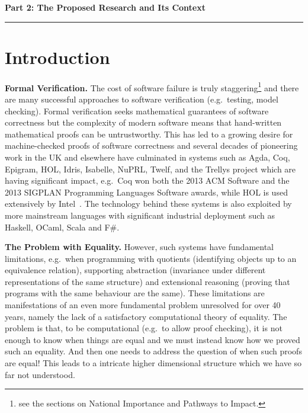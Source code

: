 \documentclass[a4paper,11pt]{article}
\newcommand{\eg}{{e.g.}\ }
\begin{document}
\newpage
\noindent
{\bf \Large Part 2: The Proposed Research and Its Context}

\vspace*{-0.23in}

\begin{center}
\rule{170mm}{.5mm}
\end{center}

\vspace*{-0.4in}

\section{Introduction}\label{sec:intro}

\vspace*{-0.1in}

{\bf Formal Verification.} The cost of software failure is truly
staggering\footnote{see the sections on National Importance and
  Pathways to Impact.} and there are many successful approaches to
software verification (\eg testing, model checking). Formal
verification seeks mathematical guarantees of software correctness but
the complexity of modern software means that hand-written mathematical
proofs can be untrustworthy. This has led to a growing desire for
machine-checked proofs of software correctness and several decades of
pioneering work in the UK and elsewhere have culminated in systems
such as Agda, Coq, Epigram, HOL, Idris, Isabelle, NuPRL, Twelf, and
the Trellys project which are having significant impact, \eg Coq won
both the 2013 ACM Software and the 2013 SIGPLAN Programming Languages
Software awards, while HOL is used extensively by
Intel~\cite{harrison:sfm}. The technology behind these systems is also
exploited by more mainstream languages with significant industrial
deployment such as Haskell, OCaml, Scala and F\#.


{\bf The Problem with Equality.} However, such systems have
fundamental limitations, \eg when programming with quotients
(identifying objects up to an equivalence relation), supporting
abstraction (invariance under different representations of the same
structure) and extensional reasoning (proving that programs with the
same behaviour are the same). These limitations are manifestations of
an even more fundamental problem unresolved for over 40 years, namely
the lack of a satisfactory computational theory of equality. The
problem is that, to be computational (\eg to allow proof checking), it
is not enough to know when things are equal and we must instead know
how we proved such an equality. And then one needs to address the
question of when such proofs are equal! This leads to a intricate
higher dimensional structure which we have so far not understood.
\end{document}

